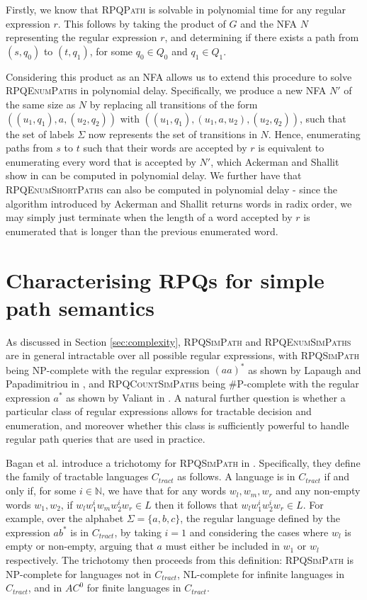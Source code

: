 \documentclass{article}
\begin{document}
Firstly, we know that \textsc{RPQPath} is solvable in polynomial time for any regular expression $r$. This follows by taking the product of $G$ and the NFA $N$ representing the regular expression $r$, and determining if there exists a path from $(s, q_0)$ to $(t, q_1)$, for some $q_0 \in Q_0$ and $q_1 \in Q_1$.

Considering this product as an NFA allows us to extend this procedure to solve \textsc{RPQEnumPaths} in polynomial delay. Specifically, we produce a new NFA $N'$ of the same size as $N$ by replacing all transitions of the form $((u_1, q_1), a, (u_2, q_2))$ with $((u_1, q_1), (u_1, a, u_2), (u_2, q_2))$, such that the set of labels $\Sigma$ now represents the set of transitions in $N$. Hence, enumerating paths from $s$ to $t$ such that their words are accepted by $r$ is equivalent to enumerating every word that is accepted by $N'$, which Ackerman and Shallit show in \cite{ackermanEfficientEnumerationWords2009} can be computed in polynomial delay. We further have that \textsc{RPQEnumShortPaths} can also be computed in polynomial delay - since the algorithm introduced by Ackerman and Shallit returns words in radix order, we may simply just terminate when the length of a word accepted by $r$ is enumerated that is longer than the previous enumerated word.


\section{Characterising RPQs for simple path semantics}
\label{sec:simple_characterisation}

As discussed in Section \ref{sec:complexity}, \textsc{RPQSimPath} and \textsc{RPQEnumSimPaths} are in general intractable over all possible regular expressions, with \textsc{RPQSimPath} being NP-complete with the regular expression $(aa)^*$ as shown by Lapaugh and Papadimitriou in \cite{lapaughEvenpathProblemGraphs1984}, and \textsc{RPQCountSimPaths} being \#P-complete with the regular expression $a^*$ as shown by Valiant in \cite{valiantComplexityComputingPermanent1979}. A natural further question is whether a particular class of regular expressions allows for tractable decision and enumeration, and moreover whether this class is sufficiently powerful to handle regular path queries that are used in practice.

Bagan et al. introduce a trichotomy for \textsc{RPQSimPath} in \cite{baganTrichotomyRegularSimple2020}. Specifically, they define the family of tractable languages $C_{tract}$ as follows. A language is in $C_{tract}$ if and only if, for some $i \in \mathbb{N}$, we have that for any words $w_l, w_m, w_r$ and any non-empty words $w_1, w_2$, if $w_l w_1^i w_m w_2^i w_r \in L$ then it follows that $w_l w_1^i w_2^i w_r \in L$. For example, over the alphabet $\Sigma = \{a, b, c\}$, the regular language defined by the expression $ab^*$ is in $C_{tract}$, by taking $i=1$ and considering the cases where $w_l$ is empty or non-empty, arguing that $a$ must either be included in $w_1$ or $w_l$ respectively. The trichotomy then proceeds from this definition: \textsc{RPQSimPath} is NP-complete for languages not in $C_{tract}$, NL-complete for infinite languages in $C_{tract}$, and in $AC^0$ for finite languages in $C_{tract}$.
\end{document}
